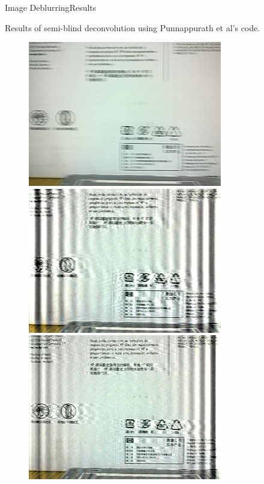 \documentclass{beamer}
\begin{document}
\begin{frame}{Image Deblurring}{Results}
\begin{figure}[H]
\begin{center}
\end{center}
\end{figure}

Results of semi-blind deconvolution using Punnappurath et al's code.

\begin{figure}[H]
\begin{center}
\resizebox{30mm}{!} {\includegraphics {../images/semiblind/blurred.png}}
\resizebox{30mm}{!} {\includegraphics {../images/semiblind/blind.png}}
\resizebox{30mm}{!} {\includegraphics {../images/semiblind/semi_blind.png}}
\end{center}
\end{figure}

\end{frame}
\end{document}
